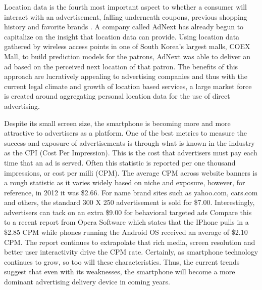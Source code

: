 Location data is the fourth most important aspect to whether a consumer will interact with an advertisement, falling underneath coupons, previous shopping history and favorite brands \cite{Abi2012}. A company called AdNext has already begun to capitalize on the insight that location data can provide. Using location data gathered by wireless access points in one of South Korea’s largest malls, COEX Mall, to build prediction models for the patrons, AdNext was able to deliver an ad based on the perceived next location of that patron\cite{adnext}. The benefits of this approach are lucratively appealing to advertising companies and thus with the current legal climate and growth of location based services, a large market force is created around aggregating personal location data for the use of direct advertising.


Despite its small screen size, the smartphone is becoming more and more attractive to advertisers as a platform.  
One of the best metrics to measure the success and exposure of advertisements is through what is known in the industry as the CPI (Cost Per Impression). 
This is the cost that advertisers must pay each time that an ad is served. Often this statistic is reported per one thousand impressions, or cost per milli (CPM). The average CPM across website banners is a rough statistic as it varies widely based on niche and exposure, however, for reference, in 2012 it was \$2.66\cite{adage}. For name brand sites such as yahoo.com, cars.com and others, the standard 300 X 250 advertisement is sold for \$7.00. Interestingly, advertisers can tack on an extra \$9.00 for behavioral targeted ads\cite{interactive_media} Compare this to a recent report from Opera Software which states that the IPhone pulls in a \$2.85 CPM while phones running the Android OS received an average of \$2.10 CPM\cite{opera}. The report continues to extrapolate that rich media, screen resolution and better user interactivity drive the CPM rate. Certainly, as smartphone technology continues to grow, so too will these characteristics. Thus, the current trends suggest that even with its weaknesses, the smartphone will become a more dominant advertising delivery device in coming years. 


